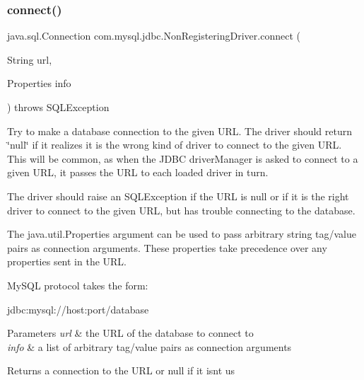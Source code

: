 \subsubsection{\texorpdfstring{connect()}{connect()}}
{\footnotesize\ttfamily java.\+sql.\+Connection com.\+mysql.\+jdbc.\+Non\+Registering\+Driver.\+connect (\begin{DoxyParamCaption}\item[{String}]{url,  }\item[{Properties}]{info }\end{DoxyParamCaption}) throws S\+Q\+L\+Exception}

Try to make a database connection to the given U\+RL. The driver should return \char`\"{}null\char`\"{} if it realizes it is the wrong kind of driver to connect to the given U\+RL. This will be common, as when the J\+D\+BC driver\+Manager is asked to connect to a given U\+RL, it passes the U\+RL to each loaded driver in turn.

The driver should raise an S\+Q\+L\+Exception if the U\+RL is null or if it is the right driver to connect to the given U\+RL, but has trouble connecting to the database. 

The java.\+util.\+Properties argument can be used to pass arbitrary string tag/value pairs as connection arguments. These properties take precedence over any properties sent in the U\+RL. 

My\+S\+QL protocol takes the form\+:


\begin{DoxyPre}
jdbc:mysql://host:port/database
\end{DoxyPre}



\begin{DoxyParams}{Parameters}
{\em url} & the U\+RL of the database to connect to \\
\hline
{\em info} & a list of arbitrary tag/value pairs as connection arguments\\
\hline
\end{DoxyParams}
\begin{DoxyReturn}{Returns}
a connection to the U\+RL or null if it isn\textquotesingle{}t us
\end{DoxyReturn}

